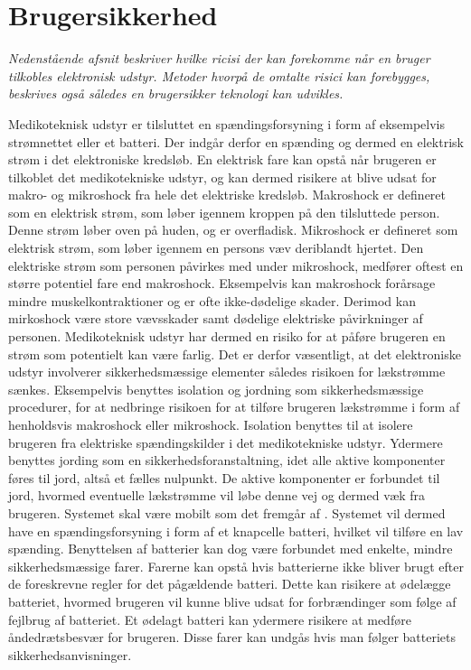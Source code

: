\section{Brugersikkerhed}
\textit{Nedenstående afsnit beskriver hvilke ricisi der kan forekomme når en bruger tilkobles elektronisk udstyr. Metoder hvorpå de omtalte risici kan forebygges, beskrives også således en brugersikker teknologi kan udvikles.}

Medikoteknisk udstyr er tilsluttet en spændingsforsyning i form af eksempelvis strømnettet eller et batteri. Der indgår derfor en spænding og dermed en elektrisk strøm i det elektroniske kredsløb. En elektrisk fare kan opstå når brugeren er tilkoblet det medikotekniske udstyr, og kan dermed risikere at blive udsat for makro- og mikroshock fra hele det elektriske kredsløb. Makroshock er defineret som en elektrisk strøm, som løber igennem kroppen på den tilsluttede person. Denne strøm løber oven på huden, og er overfladisk. Mikroshock er defineret som elektrisk strøm, som løber igennem en persons væv deriblandt hjertet. Den elektriske strøm som personen påvirkes med under mikroshock, medfører oftest en større potentiel fare end makroshock. Eksempelvis kan makroshock forårsage mindre muskelkontraktioner og er ofte ikke-dødelige skader. Derimod kan mirkoshock være store vævsskader samt dødelige elektriske påvirkninger af personen. \citep{Webster2011} \newline
Medikoteknisk udstyr har dermed en risiko for at påføre brugeren en strøm som potentielt kan være farlig. Det er derfor væsentligt, at det elektroniske udstyr involverer sikkerhedsmæssige elementer således risikoen for lækstrømme sænkes. Eksempelvis benyttes isolation og jordning som sikkerhedsmæssige procedurer, for at nedbringe risikoen for at tilføre brugeren lækstrømme i form af henholdsvis makroshock eller mikroshock. Isolation benyttes til at isolere brugeren fra elektriske spændingskilder i det medikotekniske udstyr. Ydermere benyttes jording som en sikkerhedsforanstaltning, idet alle aktive komponenter føres til jord, altså et fælles nulpunkt. De aktive komponenter er forbundet til jord, hvormed eventuelle lækstrømme vil løbe denne vej og dermed væk fra brugeren. \citep{Webster2011} \newline 
Systemet skal være mobilt som det fremgår af . Systemet vil dermed have en spændingsforsyning i form af et knapcelle batteri, hvilket vil tilføre en lav spænding. Benyttelsen af batterier kan dog være forbundet med enkelte, mindre sikkerhedsmæssige farer. Farerne kan opstå hvis batterierne ikke bliver brugt efter de foreskrevne regler for det pågældende batteri. Dette kan risikere at ødelægge batteriet, hvormed brugeren vil kunne blive udsat for forbrændinger som følge af fejlbrug af batteriet. Et ødelagt batteri kan ydermere risikere at medføre åndedrætsbesvær for brugeren. Disse farer kan undgås hvis man følger batteriets sikkerhedsanvisninger. \citep{NREL2011}


